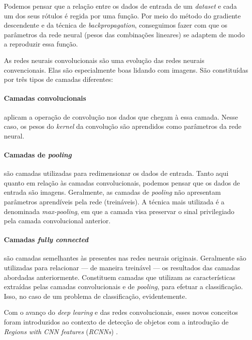Podemos pensar que a relação entre os dados de entrada de um \emph{dataset} e cada um dos seus rótulos é regida por uma função. Por meio do método do gradiente descendente e da técnica de \emph{backpropagation}, conseguimos fazer com que os parâmetros da rede neural (pesos das combinações lineares) se adaptem de modo a reproduzir essa função.

As redes neurais convolucionais são uma evolução das redes neurais convencionais. Elas são especialmente boas lidando com imagens. São constituídas por três tipos de camadas diferentes:

\paragraph{Camadas convolucionais} aplicam a operação de convolução nos dados que chegam à essa camada. Nesse caso, os pesos do \emph{kernel} da convolução são aprendidos como parâmetros da rede neural.

\paragraph{Camadas de \emph{pooling}} são camadas utilizadas para redimensionar os dados de entrada. Tanto aqui quanto em relação às camadas convolucionais, podemos pensar que os dados de entrada são imagens. Geralmente, as camadas de \emph{pooling} não apresentam parâmetros aprendíveis pela rede (treináveis). A técnica mais utilizada é a denominada \emph{max-pooling}, em que a camada visa preservar o sinal privilegiado pela camada convolucional anterior.

\paragraph{Camadas \emph{fully connected}} são camadas semelhantes às presentes nas redes neurais originais. Geralmente são utilizadas para relacionar --- de maneira treinável --- os resultados das camadas abordadas anteriormente. Constituem camadas que utilizam as características extraídas pelas camadas convolucionais e de \emph{pooling}, para efetuar a classificação. Isso, no caso de um problema de classificação, evidentemente.

Com o avanço do \emph{deep learing} e das redes convolucionais, esses novos conceitos foram introduzidos ao contexto de detecção de objetos com a introdução de \emph{Regions with CNN features} (\emph{RCNNs}) \citep{Zou2019Object, rcnn1, rcnn2}.

